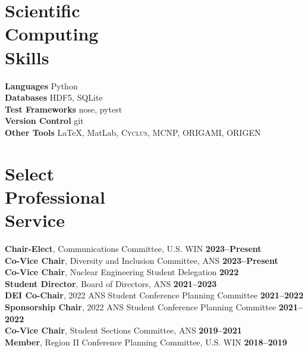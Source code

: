 \documentclass[margin,line]{resume}
\newcommand{\Cyclus}{\textsc{Cyclus}\xspace}%
\begin{document}
\begin{resume}
    \section{\mysidestyle Scientific\\Computing\\Skills}
                \textbf{Languages} \hfill Python\vspace{.5mm}\\%
                \textbf{Databases} \hfill HDF5, SQLite\vspace{.5mm}\\%
                \textbf{Test Frameworks} \hfill nose, pytest\vspace{.5mm}\\%
                \textbf{Version Control} \hfill git\vspace{.5mm}\\%
                \textbf{Other Tools} \hfill \LaTeX, MatLab, \Cyclus, MCNP, ORIGAMI, ORIGEN\vspace{.5mm}%
        \vspace{-5mm}

    \section{\mysidestyle Select\\Professional\\Service}
        \textbf{Chair-Elect}, Communications Committee, U.S. WIN  \hfill \textbf{2023--Present}\vspace{.5mm}\\%
        \textbf{Co-Vice Chair}, Diversity and Inclusion Committee, ANS  \hfill \textbf{2023--Present}\vspace{.5mm}\\%
        \textbf{Co-Vice Chair}, Nuclear Engineering Student Delegation \hfill\textbf{2022}\\
        \textbf{Student Director}, Board of Directors, ANS \hfill \textbf{2021--2023}\vspace{.5mm}\\%
        \textbf{DEI Co-Chair}, 2022 ANS Student Conference Planning Committee \hfill \textbf{2021--2022}\vspace{.5mm}\\%
        \textbf{Sponsorship Chair}, 2022 ANS Student Conference Planning Committee \hfill \textbf{2021--2022}\vspace{.5mm}\\%
        \textbf{Co-Vice Chair}, Student Sections Committee, ANS \hfill \textbf{2019--2021}\\
        \textbf{Member}, Region II Conference Planning Committee, U.S. WIN  \hfill \textbf{2018--2019}\vspace{0mm}\\%



\end{resume}
\end{document}
